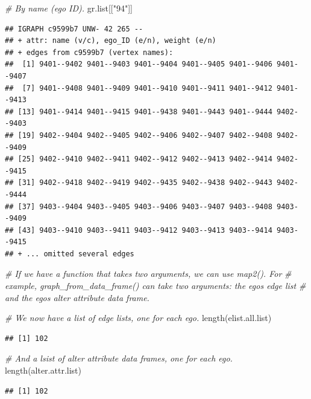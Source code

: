 \documentclass[
]{book}
\newenvironment{Shaded}{\begin{snugshade}}{\end{snugshade}}
\newcommand{\CommentTok}[1]{\textcolor[rgb]{0.56,0.35,0.01}{\textit{#1}}}
\newcommand{\FunctionTok}[1]{\textcolor[rgb]{0.00,0.00,0.00}{#1}}
\newcommand{\NormalTok}[1]{#1}
\newcommand{\StringTok}[1]{\textcolor[rgb]{0.31,0.60,0.02}{#1}}
\begin{document}
\begin{Shaded}
\begin{Highlighting}[]
\CommentTok{\# By name (ego ID).}
\NormalTok{gr.list[[}\StringTok{"94"}\NormalTok{]]}
\end{Highlighting}
\end{Shaded}

\begin{verbatim}
## IGRAPH c9599b7 UNW- 42 265 -- 
## + attr: name (v/c), ego_ID (e/n), weight (e/n)
## + edges from c9599b7 (vertex names):
##  [1] 9401--9402 9401--9403 9401--9404 9401--9405 9401--9406 9401--9407
##  [7] 9401--9408 9401--9409 9401--9410 9401--9411 9401--9412 9401--9413
## [13] 9401--9414 9401--9415 9401--9438 9401--9443 9401--9444 9402--9403
## [19] 9402--9404 9402--9405 9402--9406 9402--9407 9402--9408 9402--9409
## [25] 9402--9410 9402--9411 9402--9412 9402--9413 9402--9414 9402--9415
## [31] 9402--9418 9402--9419 9402--9435 9402--9438 9402--9443 9402--9444
## [37] 9403--9404 9403--9405 9403--9406 9403--9407 9403--9408 9403--9409
## [43] 9403--9410 9403--9411 9403--9412 9403--9413 9403--9414 9403--9415
## + ... omitted several edges
\end{verbatim}

\begin{Shaded}
\begin{Highlighting}[]
\CommentTok{\# If we have a function that takes two arguments, we can use map2(). For}
\CommentTok{\# example, graph\_from\_data\_frame() can take two arguments: the ego\textquotesingle{}s edge list}
\CommentTok{\# and the ego\textquotesingle{}s alter attribute data frame. }

\CommentTok{\# We now have a list of edge lists, one for each ego.}
\FunctionTok{length}\NormalTok{(elist.all.list)}
\end{Highlighting}
\end{Shaded}

\begin{verbatim}
## [1] 102
\end{verbatim}

\begin{Shaded}
\begin{Highlighting}[]
\CommentTok{\# And a lsist of alter attribute data frames, one for each ego.}
\FunctionTok{length}\NormalTok{(alter.attr.list)}
\end{Highlighting}
\end{Shaded}

\begin{verbatim}
## [1] 102
\end{verbatim}
\end{document}
